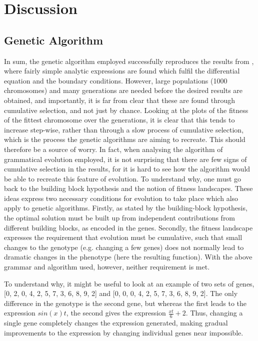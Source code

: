 \documentclass[multicolumn, 12pt]{extarticle}
\begin{document}
\section{Discussion}
\subsection{Genetic Algorithm}
In sum, the genetic algorithm employed successfully reproduces the results from \cite{Lagaris}, where fairly simple analytic expressions are found which fulfil the differential equation and the boundary conditions. However, large populations (1000 chromosomes) and many generations are needed before the desired results are obtained, and importantly, it is far from clear that these are found through cumulative selection, and not just by chance. Looking at the plots of the fitness of the fittest chromosome over the generations, it is clear that this tends to increase step-wise, rather than through a slow process of cumulative selection, which is the process the genetic algorithms are aiming to recreate. This should therefore be a source of worry. In fact, when analysing the algorithm of grammatical evolution employed, it is not surprising that there are few signs of cumulative selection in the results, for it is hard to see how the algorithm would be able to recreate this feature of evolution. To understand why, one must go back to the building block hypothesis and the notion of fitness landscapes. These ideas express two necessary conditions for evolution to take place which also apply to genetic algorithms. Firstly, as stated by the building-block hypothesis, the optimal solution must be built up from independent contributions from different building blocks, as encoded in the genes. Secondly, the fitness landscape expresses the requirement that evolution must be cumulative, such that small changes to the genotype (e.g. changing a few genes) does not normally lead to dramatic changes in the phenotype (here the resulting function). With the above grammar and algorithm used, however, neither requirement is met. 

To understand why, it might be useful to look at an example of two sets of genes, [0, 2, 0, 4, 2, 5, 7, 3, 6, 8, 9, 2] and [0, 0, 0, 4, 2, 5, 7, 3, 6, 8, 9, 2]. The only difference in the genotype is the second gene, but whereas the first leads to the expression $sin(x)t$, the second gives the expression $\frac{xt}{6} + 2$. Thus, changing a single gene completely changes the expression generated, making gradual improvements to the expression by changing individual genes near impossible. 
\end{document}
